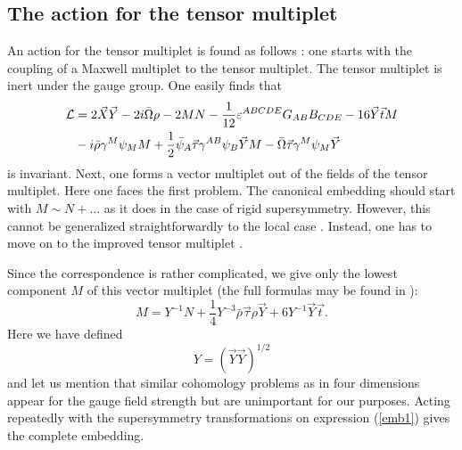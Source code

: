 \documentclass[a4paper,12pt, twoside]{article}
\numberwithin{equation}{section}
\begin{document}
\subsection{The action for the tensor multiplet}\label{tenact}
An action for the tensor multiplet is found as follows 
\cite{deWit:1983na, Bergshoeff:1986mz}: one starts with the coupling of a Maxwell 
multiplet to the tensor multiplet. The tensor multiplet is inert under the 
gauge group. One easily finds that
\begin{equation}
\begin{split}
{\cal L} & =  2 
\vec{X}\vec{Y}-2i\bar{\Omega}\rho-2MN-\frac{1}{12}\varepsilon^{ABCDE}G_{AB}B_{CDE}-16\vec{Y}\vec{t}M\\ & 
-i\bar{\rho}\gamma^M\psi_M M 
+\frac{1}{2}\bar{\psi}_A\vec{\tau}\gamma^{AB}\psi_B\vec{Y}M-\bar{\Omega}\vec{\tau}\gamma^M\psi_M\vec{Y}\label{tensoraction}
\end{split}
\end{equation}
is invariant. Next, one forms a vector multiplet out of the fields of 
the tensor multiplet. Here one faces the first problem. The canonical 
embedding should start with $M\sim N+\ldots$ as it does in the case of 
rigid supersymmetry. However, this cannot be generalized 
straightforwardly to the local case \cite{deWit:1983na}. Instead, one has to move on to 
the improved tensor multiplet \cite{deWit:1983na, deWit:1982fh}.

Since the correspondence is rather complicated, we give only the lowest 
component $M$ of this vector multiplet (the full formulas may be found 
in \cite{diss}):
\begin{equation}
M = 
Y^{-1}N+\frac{1}{4}Y^{-3}\bar{\rho}\vec{\tau}\rho\vec{Y}+6Y^{-1}\vec{Y}\vec{t}.\label{emb1}
\end{equation}
Here we have defined 
\[
Y=(\vec{Y}\vec{Y})^{1/2}
\]
and let us mention that similar cohomology problems as in four 
dimensions \cite{deWit:1983na} appear for the gauge field strength but are 
unimportant for our purposes. Acting repeatedly with the supersymmetry 
transformations on expression (\ref{emb1}) gives the complete embedding.
\end{document}
